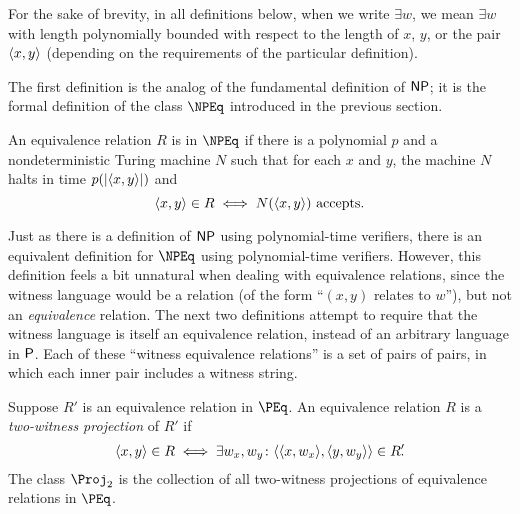 For the sake of brevity, in all definitions below, when we write $\exists w$, we mean $\exists w$ with length polynomially bounded with respect to the length of $x$, $y$, or the pair $\pair{x}{y}$ (depending on the requirements of the particular definition).

The first definition is the analog of the fundamental definition of $\NP$; it is the formal definition of the class $\NPEq$ introduced in the previous section.

\begin{definition}\label{def:npeq1}
  An equivalence relation $R$ is in $\NPEq$ if there is a polynomial $p$ and a nondeterministic Turing machine $N$ such that for each $x$ and $y$, the machine $N$ halts in time $p(\left|\pair{x}{y}\right|)$ and
  \begin{displaymath}
    \pair{x}{y} \in R \iff N(\pair{x}{y}) \text{ accepts}.
  \end{displaymath}
\end{definition}

Just as there is a definition of $\NP$ using polynomial-time verifiers, there is an equivalent definition for $\NPEq$ using polynomial-time verifiers.
However, this definition feels a bit unnatural when dealing with equivalence relations, since the witness language would be a relation (of the form ``$(x, y)$ relates to $w$''), but not an \emph{equivalence} relation.
The next two definitions attempt to require that the witness language is itself an equivalence relation, instead of an arbitrary language in $\P$.
Each of these ``witness equivalence relations'' is a set of pairs of pairs, in which each inner pair includes a witness string.

\begin{definition}\label{def:npeq3}
  Suppose $R'$ is an equivalence relation in $\PEq$.
  An equivalence relation $R$ is a \emph{two-witness projection} of $R'$ if
  \begin{displaymath}
    \pair{x}{y} \in R \iff \exists w_x, w_y \colon \pair{\pair{x}{w_x}}{\pair{y}{w_y}} \in R'\kern-0.3em.
  \end{displaymath}
  The class $\Proj_2$ is the collection of all two-witness projections of equivalence relations in $\PEq$.
\end{definition}

